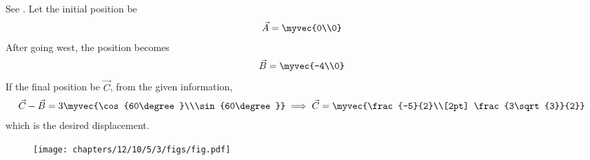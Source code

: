 See  
.
Let the initial position
be
\begin{align}
	\vec{A}=\myvec{0\\0}
\end{align}
After going west, the position becomes
\begin{align}
			\vec{B}=\myvec{-4\\0}
\end{align}
If the final position be $\vec{C}$, from the given information,
\begin{align}
	 \vec{C}-\vec{B}=3\myvec{\cos{60\degree}\\\sin{60\degree}}
	 \implies 
	\vec{C}  
=\myvec{\frac{-5}{2}\\[2pt] \frac{3\sqrt{3}}{2}}
\end{align}
which is the desired displacement. 
\begin{figure}[H] 
 \begin{center} 
 \texttt{[image: chapters/12/10/5/3/figs/fig.pdf]} 
 \end{center} 
\caption{} 
\label{fig:chapters/12/10/5/3Fig1} 
\end{figure}
